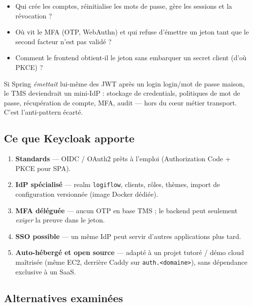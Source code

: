 \begin{itemize}[leftmargin=*]
  \item Qui crée les comptes, réinitialise les mots de passe, gère les sessions et la révocation ?
  \item Où vit le MFA (OTP, WebAuthn) et qui refuse d'émettre un jeton tant que le second facteur n'est pas validé ?
  \item Comment le frontend obtient-il le jeton sans embarquer un secret client (d'où PKCE) ?
\end{itemize}

Si Spring \emph{émettait} lui-même des JWT après un login login/mot de passe maison, le TMS
deviendrait un mini-IdP : stockage de credentials, politiques de mot de passe, récupération de
compte, MFA, audit --- hors du cœur métier transport. C'est l'anti-pattern écarté.

\subsection{Ce que Keycloak apporte}

\begin{enumerate}[leftmargin=*]
  \item \textbf{Standards} --- OIDC / OAuth2 prêts à l'emploi (Authorization Code + PKCE pour SPA).
  \item \textbf{IdP spécialisé} --- realm \texttt{logiflow}, clients, rôles, thèmes, import de
        configuration versionnée (image Docker dédiée).
  \item \textbf{MFA déléguée} --- aucun OTP en base TMS ; le backend peut seulement \emph{exiger}
        la preuve dans le jeton.
  \item \textbf{SSO possible} --- un même IdP peut servir d'autres applications plus tard.
  \item \textbf{Auto-hébergé et open source} --- adapté à un projet tutoré / démo cloud maîtrisée
        (même EC2, derrière Caddy sur \texttt{auth.<domaine>}), sans dépendance exclusive à un SaaS.
\end{enumerate}

\subsection{Alternatives examinées}

